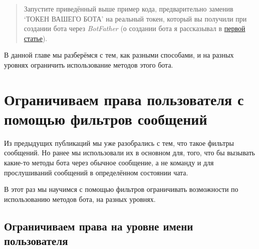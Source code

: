 \documentclass[
]{book}
\newenvironment{Shaded}{\begin{snugshade}}{\end{snugshade}}
\newcommand{\CommentTok}[1]{\textcolor[rgb]{0.56,0.35,0.01}{\textit{#1}}}
\newcommand{\FunctionTok}[1]{\textcolor[rgb]{0.13,0.29,0.53}{\textbf{#1}}}
\newcommand{\NormalTok}[1]{#1}
\newcommand{\OtherTok}[1]{\textcolor[rgb]{0.56,0.35,0.01}{#1}}
\newcommand{\SpecialCharTok}[1]{\textcolor[rgb]{0.81,0.36,0.00}{\textbf{#1}}}
\newcommand{\StringTok}[1]{\textcolor[rgb]{0.31,0.60,0.02}{#1}}
\begin{document}
\begin{Shaded}
\end{Shaded}

\begin{quote}
Запустите приведённый выше пример кода, предварительно заменив `ТОКЕН ВАШЕГО БОТА' на реальный токен, который вы получили при создании бота через \emph{BotFather} (о создании бота я рассказывал в \href{https://habr.com/ru/post/511222/\#sozdanie-telegram-bota}{первой статье}).
\end{quote}

В данной главе мы разберёмся с тем, как разными способами, и на разных уровнях ограничить использование методов этого бота.

\section{Ограничиваем права пользователя с помощью фильтров сообщений}\label{ux43eux433ux440ux430ux43dux438ux447ux438ux432ux430ux435ux43c-ux43fux440ux430ux432ux430-ux43fux43eux43bux44cux437ux43eux432ux430ux442ux435ux43bux44f-ux441-ux43fux43eux43cux43eux449ux44cux44e-ux444ux438ux43bux44cux442ux440ux43eux432-ux441ux43eux43eux431ux449ux435ux43dux438ux439}

Из предыдущих публикаций мы уже разобрались с тем, что такое фильтры сообщений. Но ранее мы использовали их в основном для, того, что бы вызывать какие-то методы бота через обычное сообщение, а не команду и для прослушиваний сообщений в определённом состоянии чата.

В этот раз мы научимся с помощью фильтров ограничивать возможности по использованию методов бота, на разных уровнях.

\subsection{Ограничиваем права на уровне имени пользователя}\label{ux43eux433ux440ux430ux43dux438ux447ux438ux432ux430ux435ux43c-ux43fux440ux430ux432ux430-ux43dux430-ux443ux440ux43eux432ux43dux435-ux438ux43cux435ux43dux438-ux43fux43eux43bux44cux437ux43eux432ux430ux442ux435ux43bux44f}
\end{document}
